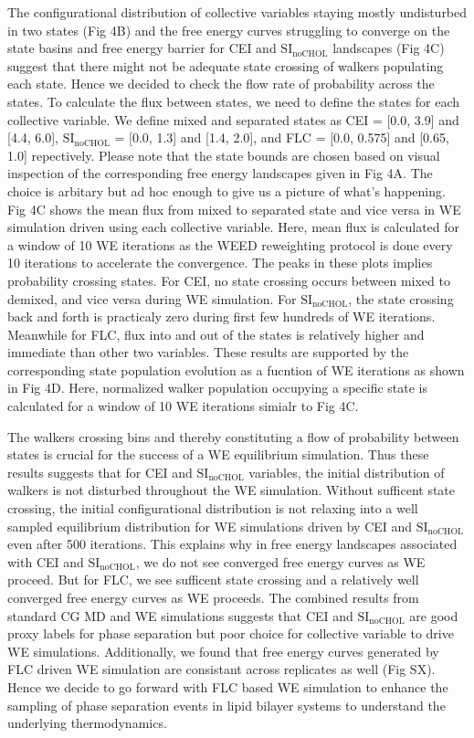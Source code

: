 \documentclass{biophys-new}
\begin{document}
The configurational distribution of collective variables staying mostly undisturbed in two states (Fig 4B) and
the free energy curves struggling to converge on the state basins and free energy barrier for CEI and $\text{SI}_{\text{noCHOL}}$ landscapes (Fig 4C) 
suggest  that there might not be adequate state crossing of walkers populating each state.
Hence we decided to check the flow rate of probability across the states.
To calculate the flux between states, we need to define the states for each collective variable.
We define mixed and separated states as CEI = [0.0, 3.9] and [4.4, 6.0], $\text{SI}_{\text{noCHOL}}$ = [0.0, 1.3] and [1.4, 2.0], and FLC = [0.0, 0.575] and [0.65, 1.0] repectively.
Please note that the state bounds are chosen based on visual inspection of the corresponding free energy landscapes given in Fig 4A.
The choice is arbitary but ad hoc enough to give us a picture of what's happening. 
Fig 4C shows the mean flux from mixed to separated state and vice versa in WE simulation driven using each collective variable.
Here, mean flux is calculated for a window of 10 WE iterations as the WEED reweighting protocol is done every 10 iterations to accelerate the convergence.
The peaks in these plots implies probability crossing states.
For CEI, no state crossing occurs between mixed to demixed, and vice versa during WE simulation.
For $\text{SI}_{\text{noCHOL}}$, the state crossing back and forth is practicaly zero during first few hundreds of WE iterations.
Meanwhile for FLC, flux into and out of the states is relatively higher and immediate than other two variables.
These results are supported by the corresponding state population evolution as a fucntion of WE iterations as shown in Fig 4D.
Here, normalized walker population occupying a specific state is calculated for a window of 10 WE iterations simialr to Fig 4C.

The walkers crossing bins and thereby constituting a flow of probability between states is crucial for the success of a WE equilibrium simulation\cite{Zuckerman2017}.
Thus these results suggests that for CEI and $\text{SI}_{\text{noCHOL}}$ variables, the initial distribution of walkers is not disturbed throughout the WE simulation.
Without sufficent state crossing, the initial configurational distribution is not relaxing into a well sampled equilibrium distribution for WE simulations driven by CEI and $\text{SI}_{\text{noCHOL}}$ even after 500 iterations. 
This explains why in free energy landscapes associated with CEI and $\text{SI}_{\text{noCHOL}}$, we do not see converged free energy curves as WE proceed.
But for FLC, we see sufficent state crossing and a relatively well converged free energy curves as WE proceeds. 
The combined results from standard CG MD and WE simulations suggests that CEI and $\text{SI}_{\text{noCHOL}}$ are good proxy labels for phase separation but poor choice for collective variable to drive WE simulations.
Additionally, we found that free energy curves generated by FLC driven WE simulation are consistant across replicates as well (Fig SX).
Hence we decide to go forward with FLC based WE simulation to enhance the sampling of phase separation events in lipid bilayer systems to understand the underlying thermodynamics.
\\ 
\end{document}

